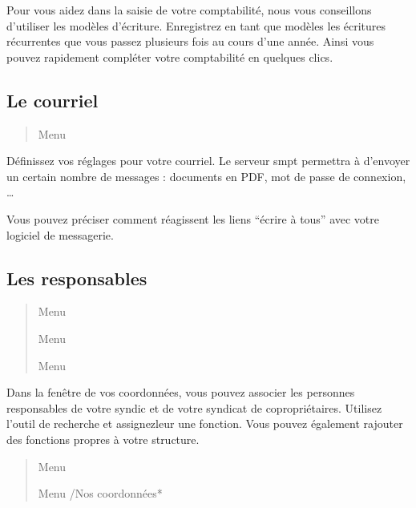 \documentclass[a4paper,10pt,oneside,french]{sphinxmanual}
\begin{document}
\sphinxAtStartPar
Pour vous aidez dans la saisie de votre comptabilité, nous vous conseillons d’utiliser les modèles d’écriture. Enregistrez en tant que modèles les écritures récurrentes que vous passez plusieurs fois au cours d’une année. Ainsi vous pouvez rapidement compléter votre comptabilité en quelques clics.


\subsection{Le courriel}
\label{\detokenize{syndic/first_step:le-courriel}}\begin{quote}

\sphinxAtStartPar
Menu 
\end{quote}

\sphinxAtStartPar
Définissez vos réglages pour votre courriel.
Le serveur smpt permettra à  d’envoyer un certain nombre de messages : documents en PDF, mot de passe de connexion, …

\sphinxAtStartPar
Vous pouvez préciser comment réagissent les liens “écrire à tous” avec votre logiciel de messagerie.


\subsection{Les responsables}
\label{\detokenize{syndic/first_step:les-responsables}}\begin{quote}

\sphinxAtStartPar
Menu 

\sphinxAtStartPar
Menu 

\sphinxAtStartPar
Menu 
\end{quote}

\sphinxAtStartPar
Dans la fenêtre de vos coordonnées, vous pouvez associer les personnes responsables de votre syndic et de votre syndicat de copropriétaires.
Utilisez l’outil de recherche et assignez\sphinxhyphen{}leur une fonction.
Vous pouvez également rajouter des fonctions propres à votre structure.
\begin{quote}

\sphinxAtStartPar
Menu 

\sphinxAtStartPar
Menu /Nos coordonnées*
\end{quote}
\end{document}
